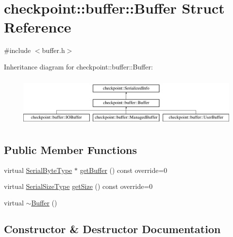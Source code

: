 \hypertarget{structcheckpoint_1_1buffer_1_1_buffer}{}\section{checkpoint\+:\+:buffer\+:\+:Buffer Struct Reference}
\label{structcheckpoint_1_1buffer_1_1_buffer}


{\ttfamily \#include $<$buffer.\+h$>$}

Inheritance diagram for checkpoint\+:\+:buffer\+:\+:Buffer\+:\begin{figure}[H]
\begin{center}
\leavevmode
\includegraphics[height=2.604651cm]{structcheckpoint_1_1buffer_1_1_buffer}
\end{center}
\end{figure}
\subsection*{Public Member Functions}
\begin{DoxyCompactItemize}
\item 
virtual \hyperlink{namespacecheckpoint_ae57f01cdc0b81776c23b6c7c934c58f5}{Serial\+Byte\+Type} $\ast$ \hyperlink{structcheckpoint_1_1buffer_1_1_buffer_a11fcf5b280408aef29cd21dd722006c3}{get\+Buffer} () const override=0
\item 
virtual \hyperlink{namespacecheckpoint_a083f6674da3f94c2901b18c6d238217c}{Serial\+Size\+Type} \hyperlink{structcheckpoint_1_1buffer_1_1_buffer_a8f21655f43c4424cd88435ddebbb2d3c}{get\+Size} () const override=0
\item 
virtual \hyperlink{structcheckpoint_1_1buffer_1_1_buffer_a55f9f6a754d4b3053460b8543b6ca1ab}{$\sim$\+Buffer} ()
\end{DoxyCompactItemize}


\subsection{Constructor \& Destructor Documentation}
\mbox{\label{structcheckpoint_1_1buffer_1_1_buffer_a55f9f6a754d4b3053460b8543b6ca1ab}} 

